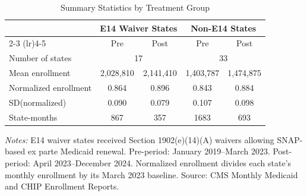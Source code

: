 \begin{table}[t]
\centering
\caption{Summary Statistics by Treatment Group}
\label{tab:summary}
\small
\begin{tabular}{lcccc}
\toprule
 & \multicolumn{2}{c}{E14 Waiver States} & \multicolumn{2}{c}{Non-E14 States} \\
\cmidrule(lr){2-3} \cmidrule(lr){4-5}
 & Pre & Post & Pre & Post \\
\midrule
Number of states & \multicolumn{2}{c}{17} & \multicolumn{2}{c}{33} \\
Mean enrollment & 2,028,810 & 2,141,410 & 1,403,787 & 1,474,875 \\
Normalized enrollment & 0.864 & 0.896 & 0.843 & 0.884 \\
SD(normalized) & 0.090 & 0.079 & 0.107 & 0.098 \\
State-months & 867 & 357 & 1683 & 693 \\
\bottomrule
\end{tabular}
\begin{tablenotes}
\item \textit{Notes:} E14 waiver states received Section 1902(e)(14)(A) waivers allowing SNAP-based ex parte Medicaid renewal. Pre-period: January 2019--March 2023. Post-period: April 2023--December 2024. Normalized enrollment divides each state's monthly enrollment by its March 2023 baseline. Source: CMS Monthly Medicaid and CHIP Enrollment Reports.
\end{tablenotes}
\end{table}

